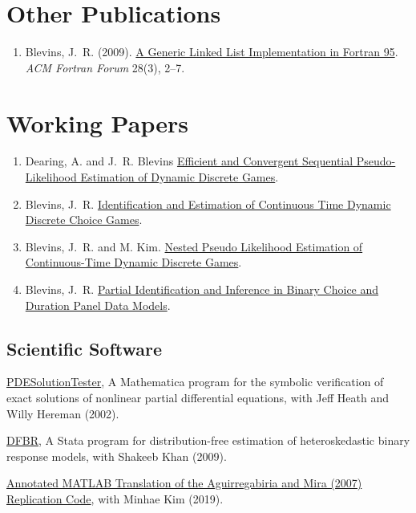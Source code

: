 \documentclass[10pt,letterpaper]{article}
\renewenvironment{itemize}{
  \begin{list}{}{
      \setlength{\leftmargin}{1.5em}
      \setlength{\itemsep}{0.25em}
      \setlength{\parskip}{0pt}
      \setlength{\parsep}{0.25em}
    }
}{
  \end{list}
}
\begin{document}
\section*{Other Publications}

\begin{enumerate}[resume]
\item Blevins, J.~R. (2009).
  \href{https://jblevins.org/research/generic-list}{A Generic Linked List Implementation in Fortran 95}.
  \textit{ACM Fortran Forum} 28(3), 2--7.
\end{enumerate}

\section*{Working Papers}

\begin{enumerate}[resume]
\item Dearing, A. and J.~R. Blevins
    \href{https://jblevins.org/research/epl}{Efficient and Convergent Sequential Pseudo-Likelihood Estimation of Dynamic Discrete Games}.
\item Blevins, J.~R.
  \href{https://jblevins.org/research/ctgames}{Identification and Estimation of Continuous Time Dynamic Discrete Choice Games}.
\item Blevins, J.~R. and M. Kim.
    \href{https://jblevins.org/research/ctnpl}{Nested Pseudo Likelihood Estimation of Continuous-Time Dynamic Discrete Games}.
\item Blevins, J.~R.
  \href{https://jblevins.org/research/panel}{Partial Identification and Inference in Binary Choice and Duration Panel Data Models}.
\end{enumerate}

\subsection*{Scientific Software}

\begin{itemize}
\item \href{https://jblevins.org/research/pdest}{PDESolutionTester},
  A Mathematica program for the symbolic verification of exact solutions
  of nonlinear partial differential equations,
  with Jeff Heath and Willy Hereman (2002).
\item \href{https://jblevins.org/research/dfbr}{DFBR},
  A Stata program for distribution-free estimation of heteroskedastic
  binary response models,
  with Shakeeb Khan (2009).
\item \href{https://jblevins.org/research/am_2007}{Annotated MATLAB Translation of the Aguirregabiria and Mira (2007) Replication Code},
  with Minhae Kim (2019).
\end{itemize}
\end{document}

